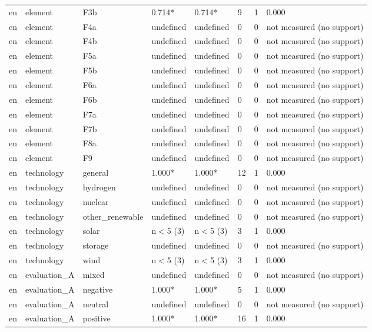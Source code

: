 \begin{table}[htbp]
\begin{tabular}{llllllll}
en & element & F3b & 0.714* & 0.714* & 9 & 1 & 0.000 \\
en & element & F4a & undefined & undefined & 0 & 0 & not measured (no support) \\
en & element & F4b & undefined & undefined & 0 & 0 & not measured (no support) \\
en & element & F5a & undefined & undefined & 0 & 0 & not measured (no support) \\
en & element & F5b & undefined & undefined & 0 & 0 & not measured (no support) \\
en & element & F6a & undefined & undefined & 0 & 0 & not measured (no support) \\
en & element & F6b & undefined & undefined & 0 & 0 & not measured (no support) \\
en & element & F7a & undefined & undefined & 0 & 0 & not measured (no support) \\
en & element & F7b & undefined & undefined & 0 & 0 & not measured (no support) \\
en & element & F8a & undefined & undefined & 0 & 0 & not measured (no support) \\
en & element & F9 & undefined & undefined & 0 & 0 & not measured (no support) \\
en & technology & general & 1.000* & 1.000* & 12 & 1 & 0.000 \\
en & technology & hydrogen & undefined & undefined & 0 & 0 & not measured (no support) \\
en & technology & nuclear & undefined & undefined & 0 & 0 & not measured (no support) \\
en & technology & other\_renewable & undefined & undefined & 0 & 0 & not measured (no support) \\
en & technology & solar & n$<$5 (3) & n$<$5 (3) & 3 & 1 & 0.000 \\
en & technology & storage & undefined & undefined & 0 & 0 & not measured (no support) \\
en & technology & wind & n$<$5 (3) & n$<$5 (3) & 3 & 1 & 0.000 \\
en & evaluation\_A & mixed & undefined & undefined & 0 & 0 & not measured (no support) \\
en & evaluation\_A & negative & 1.000* & 1.000* & 5 & 1 & 0.000 \\
en & evaluation\_A & neutral & undefined & undefined & 0 & 0 & not measured (no support) \\
en & evaluation\_A & positive & 1.000* & 1.000* & 16 & 1 & 0.000 \\

\end{tabular}
\end{table}
